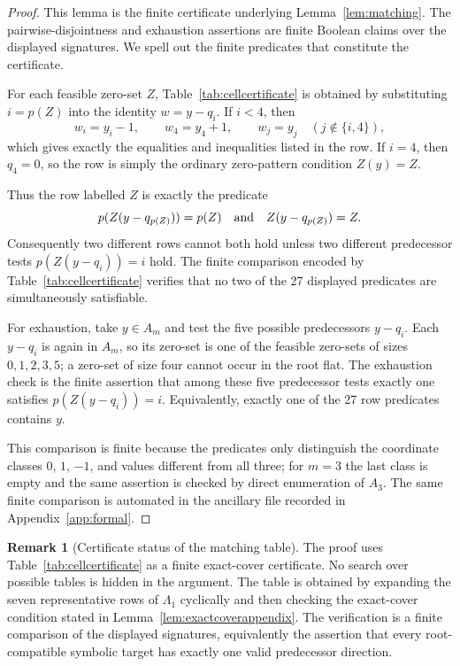\documentclass[11pt]{article}
\theoremstyle{definition}
\newtheorem{remark}{Remark}
\begin{document}
\begin{proof}
This lemma is the finite certificate underlying Lemma~\ref{lem:matching}.  The pairwise-disjointness
and exhaustion assertions are finite Boolean claims over the displayed signatures.  We spell out the
finite predicates that constitute the certificate.

For each feasible zero-set \(Z\), Table~\ref{tab:cellcertificate} is obtained by substituting
\(i=p(Z)\) into the identity \(w=y-q_i\).  If \(i<4\), then
\[
w_i=y_i-1,
\qquad
w_4=y_4+1,
\qquad
w_j=y_j\quad(j\notin\{i,4\}),
\]
which gives exactly the equalities and inequalities listed in the row.  If \(i=4\), then \(q_4=0\),
so the row is simply the ordinary zero-pattern condition \(Z(y)=Z\).

Thus the row labelled \(Z\) is exactly the predicate
\[
p(Z(y-q_{p(Z)}))=p(Z)
\quad\hbox{and}\quad
Z(y-q_{p(Z)})=Z.
\]
Consequently two different rows cannot both hold unless two different predecessor tests
\(p(Z(y-q_i))=i\) hold.  The finite comparison encoded by Table~\ref{tab:cellcertificate} verifies that no two of the 27
displayed predicates are simultaneously satisfiable.

For exhaustion, take \(y\in A_m\) and test the five possible predecessors \(y-q_i\).  Each
\(y-q_i\) is again in \(A_m\), so its zero-set is one of the feasible zero-sets of sizes
\(0,1,2,3,5\); a zero-set of size four cannot occur in the root flat.  The exhaustion check is the
finite assertion that among these five predecessor tests exactly one satisfies \(p(Z(y-q_i))=i\).
Equivalently, exactly one of the 27 row predicates contains \(y\).

This comparison is finite because the predicates only distinguish the coordinate classes
\(0\), \(1\), \(-1\), and values different from all three; for \(m=3\) the last class is empty and the
same assertion is checked by direct enumeration of \(A_3\).  The same finite comparison is automated
in the ancillary file recorded in Appendix~\ref{app:formal}.
\end{proof}


\begin{remark}[Certificate status of the matching table]\label{rem:matching-formal}
The proof uses Table~\ref{tab:cellcertificate} as a finite exact-cover certificate.  No search over
possible tables is hidden in the argument.  The table is obtained by expanding the seven representative
rows of \(\Lambda_1\) cyclically and then checking the exact-cover condition stated in
Lemma~\ref{lem:exactcoverappendix}.  The verification is a finite comparison of the displayed
signatures, equivalently the assertion that every root-compatible symbolic target has exactly one
valid predecessor direction.
\end{remark}
\end{document}
